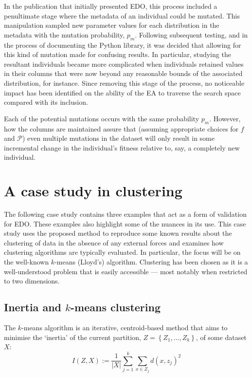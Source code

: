In the publication that initially presented EDO, this process included a
penultimate stage where the metadata of an individual could be mutated. This
manipulation sampled new parameter values for each distribution in the metadata
with the mutation probability, \(p_m\). Following subsequent testing, and in the
process of documenting the Python library, it was decided that allowing for this
kind of mutation made for confusing results. In particular, studying the
resultant individuals became more complicated when individuals retained values
in their columns that were now beyond any reasonable bounds of the associated
distribution, for instance. Since removing this stage of the process, no
noticeable impact has been identified on the ability of the EA to traverse the
search space compared with its inclusion.


Each of the potential mutations occurs with the same probability \(p_m\).
However, how the columns are maintained assure that (assuming appropriate
choices for \(f\) and \(\mathcal{P}\)) even multiple mutations in the dataset
will only result in some incremental change in the individual's fitness relative
to, say, a completely new individual.



\section{A case study in clustering}\label{section:examples}

The following case study contains three examples that act as a form of
validation for EDO. These examples also highlight some of the nuances in its
use. This case study uses the proposed method to reproduce some known results
about the clustering of data in the absence of any external forces and examines
how clustering algorithms are typically evaluated. In particular, the focus will
be on the well-known \(k\)-means (Lloyd's) algorithm. Clustering has been chosen
as it is a well-understood problem that is easily accessible --- most notably
when restricted to two dimensions.

\subsection{Inertia and \(k\)-means clustering}

The \(k\)-means algorithm is an iterative, centroid-based method that aims to
minimise the `inertia' of the current partition, \(Z = \left\{Z_1, \ldots,
Z_k\right\}\), of some dataset \(X\):
\begin{equation}
    I(Z, X) := \frac{1}{|X|} \sum_{j=1}^{k} \sum_{x \in Z_j} {d(x, z_j)}^2
    \label{eq:inertia}
\end{equation}

